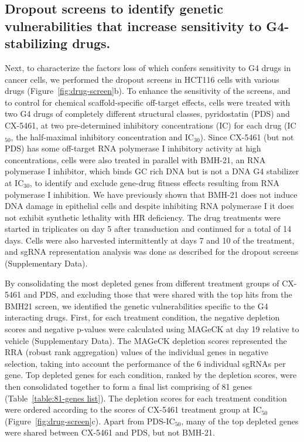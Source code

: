 \subsection{Dropout screens to identify genetic vulnerabilities that increase sensitivity to G4-stabilizing drugs.}
Next, to characterize the factors loss of which confers sensitivity to G4 drugs in cancer cells, we performed the dropout screens in HCT116 cells with various drugs (Figure~\ref{fig:drug-screen}b). 
To enhance the sensitivity of the screens, and to control for chemical scaffold-specific off-target effects, cells were treated with two G4 drugs of completely different structural classes, pyridostatin (PDS) and CX-5461, at two pre-determined inhibitory concentrations (IC) for each drug (IC$_{50}$, the half-maximal inhibitory concentration and IC$_{30}$). 
Since CX-5461 (but not PDS) has some off-target RNA polymerase I inhibitory activity at high concentrations\cite{Xu2017}, cells were also treated in parallel with BMH-21, an RNA polymerase I inhibitor, which binds GC rich DNA but is not a DNA G4 stabilizer at IC$_{30}$, to identify and exclude gene-drug fitness effects resulting from RNA polymerase I inhibition.
We have previously shown that BMH-21 does not induce DNA damage in epithelial cells and despite inhibiting RNA polymerase I it does not exhibit synthetic lethality with HR deficiency.
The drug treatments were started in triplicates on day 5 after transduction and continued for a total of 14 days. 
Cells were also harvested intermittently at days 7 and 10 of the treatment, and sgRNA representation analysis was done as described for the dropout screens (Supplementary Data).  

By consolidating the most depleted genes from different treatment groups of CX-5461 and PDS, and excluding those that were shared with the top hits from the BMH21 screen, we identified the genetic vulnerabilities specific to the G4 interacting drugs. 
First, for each treatment condition, the negative depletion scores and negative p-values were calculated using MAGeCK at day 19 relative to vehicle (Supplementary Data). 
The MAGeCK depletion scores represented the RRA (robust rank aggregation) values of the individual genes in negative selection, taking into account the performance of the 6 individual sgRNAs per gene. 
Top depleted genes for each condition, ranked by the depletion scores, were then consolidated together to form a final list comprising of 81 genes (Table~\ref{table:81-genes list}). 
The depletion scores for each treatment condition were ordered according to the scores of CX-5461 treatment group at IC$_{50}$ (Figure~\ref{fig:drug-screen}c). 
Apart from PDS-IC$_{50}$, many of the top depleted genes were shared between CX-5461 and PDS, but not BMH-21. 

